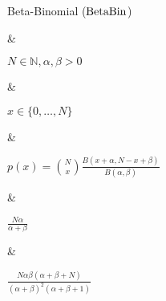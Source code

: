 Beta-Binomial ($\operatorname{BetaBin}$)

&

$N \in \mathbb N, \alpha, \beta > 0$

&

$x \in \{0, \dotsc, N\}$

&

\(\displaystyle
	p(x) = \binom{N}{x} \frac{B(x + \alpha, N - x + \beta)}{B(\alpha, \beta)}
\)

& 

$\frac{N\alpha}{\alpha + \beta}$

&

$\frac{N\alpha\beta(\alpha + \beta + N)}{(\alpha + \beta)^2(\alpha + \beta + 1)}$